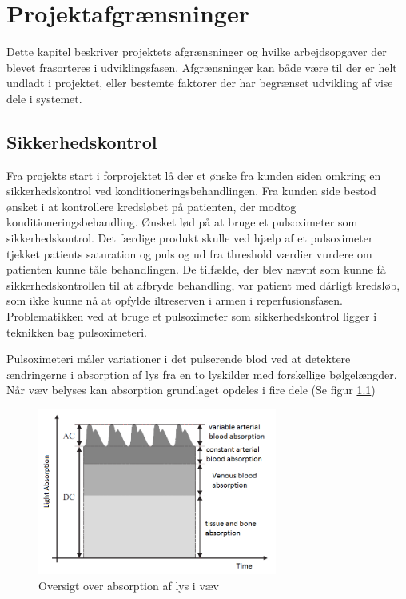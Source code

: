 \chapter{Projektafgrænsninger}
Dette kapitel beskriver projektets afgrænsninger og hvilke arbejdsopgaver der blevet frasorteres i udviklingsfasen. Afgrænsninger kan både være til der er helt undladt i projektet, eller bestemte faktorer der har begrænset udvikling af vise dele i systemet. 

\section{Sikkerhedskontrol} \label{title:sikkerhedskontrol}
Fra projekts start i forprojektet lå der et ønske fra kunden siden omkring en sikkerhedskontrol ved konditioneringsbehandlingen. Fra kunden side bestod ønsket i at kontrollere kredsløbet på patienten, der modtog konditioneringsbehandling. Ønsket lød på at bruge et pulsoximeter som sikkerhedskontrol. Det færdige produkt skulle ved hjælp af et pulsoximeter tjekket patients saturation og puls og ud fra threshold værdier vurdere om patienten kunne tåle behandlingen. De tilfælde, der blev nævnt som kunne få sikkerhedskontrollen til at afbryde behandling, var patient med dårligt kredsløb, som ikke kunne nå at opfylde iltreserven i armen i reperfusionsfasen. Problematikken ved at bruge et pulsoximeter som sikkerhedskontrol ligger i teknikken bag pulsoximeteri. 

Pulsoximeteri måler variationer i det pulserende blod ved at detektere ændringerne i absorption af lys fra en to lyskilder med forskellige bølgelængder. Når væv belyses kan absorption grundlaget opdeles i fire dele (Se figur \ref{fig:opticTissue})
\begin{figure}[H]
	\centering
	\includegraphics[width = 0.7\textwidth]{billeder/opticTissue.png}
	\caption{Oversigt over absorption af lys i væv}\label{fig:opticTissue}
\end{figure}

